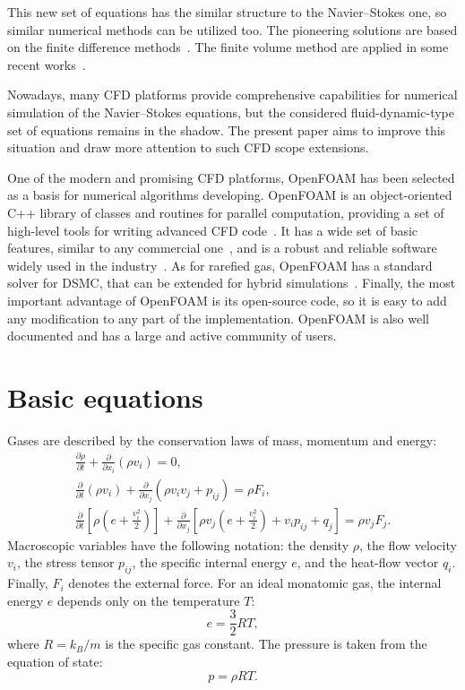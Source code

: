\documentclass[smallextended, referee]{svjour3} %
\newcommand{\pder}[2][]{\frac{\partial#1}{\partial#2}}
\begin{document}
This new set of equations has the similar structure to the Navier--Stokes one,
so similar numerical methods can be utilized too.
The pioneering solutions are based on the finite difference methods~\cite{GhostEffect, Kogan1976}.
The finite volume method are applied in some recent works~\cite{Laneryd2006, Laneryd2007}.

Nowadays, many CFD platforms provide comprehensive
capabilities for numerical simulation of the Navier--Stokes equations,
but the considered fluid-dynamic-type set of equations remains in the shadow.
The present paper aims to improve this situation and
draw more attention to such CFD scope extensions.

One of the modern and promising CFD platforms, OpenFOAM\textregistered{}
has been selected as a basis for numerical algorithms developing.
OpenFOAM\textregistered{} is an object-oriented C++ library of classes and routines for parallel computation,
providing a set of high-level tools for writing advanced CFD code~\cite{OpenFOAM1998}.
It has a wide set of basic features, similar to any commercial one~\cite{OpenFOAM2010},
and is a robust and reliable software widely used in the industry~\cite{BoilingFlows2009,
TurbulentCombustion2011, CoastalEngineering2013, BiomassPyrolysis2013}.
As for rarefied gas, OpenFOAM\textregistered{} has a standard solver for DSMC, that
can be extended for hybrid simulations~\cite{HybridSolver2012}.
Finally, the most important advantage of OpenFOAM\textregistered{} is its open-source code,
so it is easy to add any modification to any part of the implementation.
OpenFOAM\textregistered{} is also well documented and has a large and active community of users.

\section{Basic equations}

Gases are described by the conservation laws of mass, momentum and energy:
\begin{gather}
	\pder[\rho]{t} + \pder{x_i}(\rho v_i) = 0, \label{eq:mass}\\
	\pder{t}(\rho v_i) + \pder{x_j}(\rho v_i v_j + p_{ij}) = \rho F_i, \label{eq:momentum}\\
	\pder{t}\left[\rho\left(e+\frac{v_i^2}2\right)\right] +
		\pder{x_j}\left[\rho v_j\left(e+\frac{v_i^2}2\right)+v_i p_{ij}+q_j\right] = \rho v_j F_j. \label{eq:energy}
\end{gather}
Macroscopic variables have the following notation: the density \(\rho\), the flow velocity \(v_i\), the stress tensor \(p_{ij}\),
the specific internal energy \(e\), and the heat-flow vector \(q_i\). Finally, \(F_i\) denotes the external force.
For an ideal monatomic gas, the internal energy \(e\) depends only on the temperature \(T\):
\[ e = \frac32RT, \]
where \(R = k_B / m\) is the specific gas constant. The pressure is taken from the equation of state:
\[ p = \rho RT. \]
\end{document}
